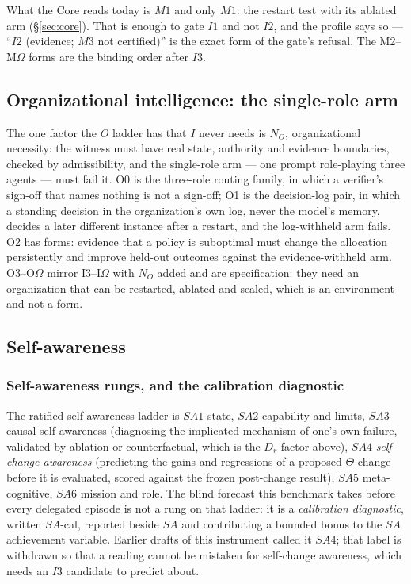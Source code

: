 \documentclass[11pt]{article}
\theoremstyle{definition}
\begin{document}
What the Core reads today is $M1$ and only $M1$: the restart test with its ablated arm (\S\ref{sec:core}). That is enough to gate $I1$ and not $I2$, and the profile says so --- ``$I2$ (evidence; $M3$ not certified)'' is the exact form of the gate's refusal. The M2--M$\Omega$ forms are the binding order after $I3$.


\subsection{Organizational intelligence: the single-role arm}
The one factor the $O$ ladder has that $I$ never needs is $N_O$, organizational necessity: the witness must have real state, authority and evidence boundaries, checked by admissibility, and the single-role arm --- one prompt role-playing three agents --- must fail it. O0 is the three-role routing family, in which a verifier's sign-off that names nothing is not a sign-off; O1 is the decision-log pair, in which a standing decision in the organization's own log, never the model's memory, decides a later different instance after a restart, and the log-withheld arm fails. O2 has forms: evidence that a policy is suboptimal must change the allocation persistently and improve held-out outcomes against the evidence-withheld arm. O3--O$\Omega$ mirror I3--I$\Omega$ with $N_O$ added and are specification: they need an organization that can be restarted, ablated and sealed, which is an environment and not a form.

\subsection{Self-awareness}
\subsubsection{Self-awareness rungs, and the calibration diagnostic}\label{sec:sacal}

The ratified self-awareness ladder is $SA1$ state, $SA2$ capability and limits, $SA3$ causal self-awareness (diagnosing the implicated mechanism of one's own failure, validated by ablation or counterfactual, which is the $D_r$ factor above), $SA4$ \emph{self-change awareness} (predicting the gains and regressions of a proposed $\Theta$ change before it is evaluated, scored against the frozen post-change result), $SA5$ meta-cognitive, $SA6$ mission and role. The blind forecast this benchmark takes before every delegated episode is not a rung on that ladder: it is a \emph{calibration diagnostic}, written $SA$-cal, reported beside $SA$ and contributing a bounded bonus to the $SA$ achievement variable. Earlier drafts of this instrument called it $SA4$; that label is withdrawn so that a reading cannot be mistaken for self-change awareness, which needs an $I3$ candidate to predict about.
\end{document}
